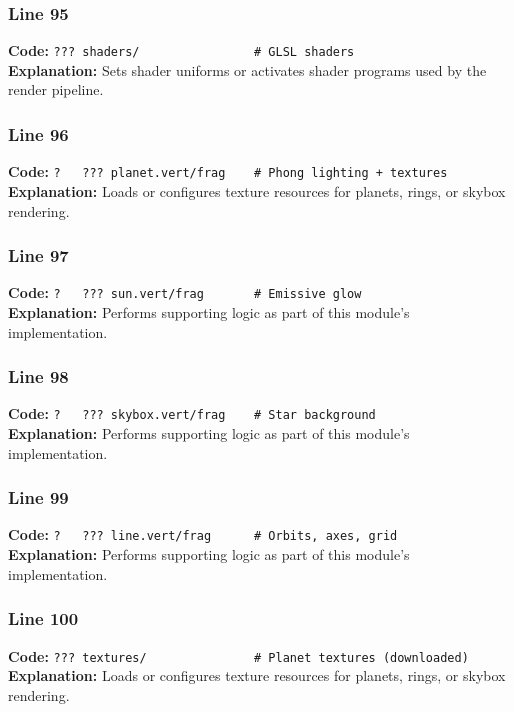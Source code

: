 \documentclass[11pt,a4paper]{article}
\begin{document}
\subsubsection*{Line 95}
\textbf{Code:} \verb|??? shaders/                # GLSL shaders|\\
\textbf{Explanation:} Sets shader uniforms or activates shader programs used by the render pipeline.

\subsubsection*{Line 96}
\textbf{Code:} \verb|?   ??? planet.vert/frag    # Phong lighting + textures|\\
\textbf{Explanation:} Loads or configures texture resources for planets, rings, or skybox rendering.

\subsubsection*{Line 97}
\textbf{Code:} \verb|?   ??? sun.vert/frag       # Emissive glow|\\
\textbf{Explanation:} Performs supporting logic as part of this module's implementation.

\subsubsection*{Line 98}
\textbf{Code:} \verb|?   ??? skybox.vert/frag    # Star background|\\
\textbf{Explanation:} Performs supporting logic as part of this module's implementation.

\subsubsection*{Line 99}
\textbf{Code:} \verb|?   ??? line.vert/frag      # Orbits, axes, grid|\\
\textbf{Explanation:} Performs supporting logic as part of this module's implementation.

\subsubsection*{Line 100}
\textbf{Code:} \verb|??? textures/               # Planet textures (downloaded)|\\
\textbf{Explanation:} Loads or configures texture resources for planets, rings, or skybox rendering.
\end{document}
